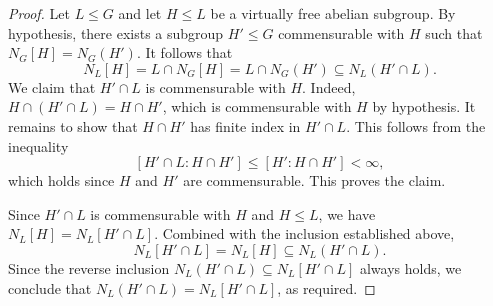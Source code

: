 \documentclass[10pt,a4paper]{amsart}
\begin{document}
\begin{proof}
Let $L \leq G$ and let $H \leq L$ be a virtually free abelian subgroup. By
hypothesis, there exists a subgroup $H' \leq G$ commensurable with $H$ such that
$N_G[H] = N_G(H')$. It follows that
\[
  N_L[H] = L \cap N_G[H] = L \cap N_G(H') \subseteq N_L(H' \cap L).
\]
We claim that $H' \cap L$ is commensurable with $H$. Indeed, $H \cap (H' \cap L)
= H \cap H'$, which is commensurable with $H$ by hypothesis. It remains to show
that $H \cap H'$ has finite index in $H' \cap L$. This follows from the inequality
\[
  [H' \cap L : H \cap H'] \leq [H' : H \cap H']  < \infty,
\]
which holds since $H$ and $H'$ are commensurable. This proves the claim.

Since $H' \cap L$ is commensurable with $H$ and $H \leq L$, we have $N_L[H] =
N_L[H' \cap L]$. Combined with the inclusion established above,
\[
  N_L[H' \cap L] = N_L[H] \subseteq N_L(H' \cap L).
\]
Since the reverse inclusion $N_L(H' \cap L) \subseteq N_L[H' \cap L]$ always
holds, we conclude that $N_L(H' \cap L) = N_L[H' \cap L]$, as required.
\end{proof}
\end{document}
